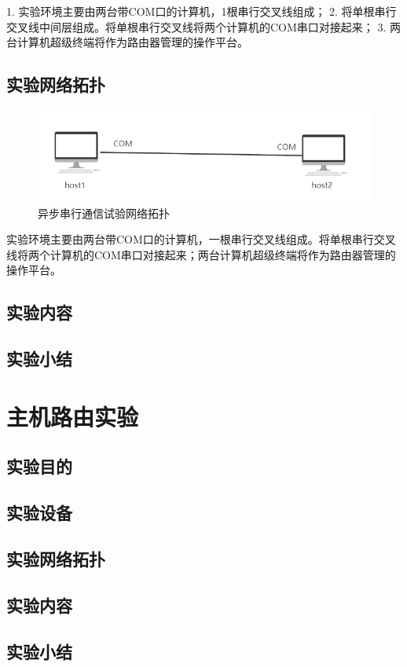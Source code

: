 \documentclass[lang=cn,11pt,a4paper,cite=authoryear]{elegantpaper}
\begin{document}
1. 实验环境主要由两台带COM口的计算机，1根串行交叉线组成；
2. 将单根串行交叉线中间层组成。将单根串行交叉线将两个计算机的COM串口对接起来；
3. 两台计算机超级终端将作为路由器管理的操作平台。

\subsection{实验网络拓扑}

\begin{figure}[htbp]
	\centering
	\includegraphics[width=0.7\linewidth]{image/screenshot013}
	\caption{异步串行通信试验网络拓扑}
	\label{fig:screenshot013}
\end{figure}

实验环境主要由两台带COM口的计算机，一根串行交叉线组成。将单根串行交叉线将两个计算机的COM串口对接起来；两台计算机超级终端将作为路由器管理的操作平台。

\subsection{实验内容}
\subsection{实验小结}
\section{主机路由实验}
\subsection{实验目的}
\subsection{实验设备}
\subsection{实验网络拓扑}
\subsection{实验内容}
\subsection{实验小结}
\end{document}

